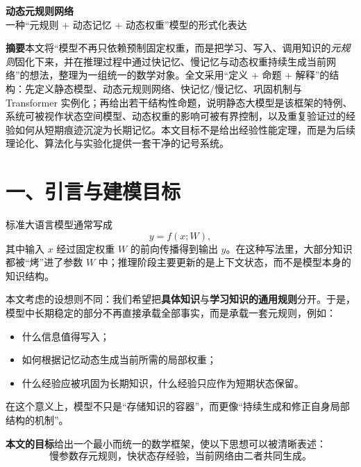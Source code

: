 \documentclass[11pt]{article}
\begin{document}
\begin{titlepage}
\centering
\vspace*{1.8cm}
{\Huge\bfseries 动态元规则网络\\[0.35em]}
{\Large \color{Accent}一种“元规则 + 动态记忆 + 动态权重”模型的形式化表达\\}
\vspace{1.2cm}
\begin{tcolorbox}[width=0.9\textwidth,colback=LightAccent,colframe=Accent,boxrule=0.7pt]
\small
\textbf{摘要}\quad 本文将“模型不再只依赖预制固定权重，而是把学习、写入、调用知识的\emph{元规则}固化下来，并在推理过程中通过快记忆、慢记忆与动态权重持续生成当前网络”的想法，整理为一组统一的数学对象。全文采用“定义 + 命题 + 解释”的结构：先定义静态模型、动态元规则网络、快记忆/慢记忆、巩固机制与 Transformer 实例化；再给出若干结构性命题，说明静态大模型是该框架的特例、系统可被视作状态空间模型、动态权重的影响可被有界控制，以及重复验证过的经验如何从短期痕迹沉淀为长期记忆。本文目标不是给出经验性能定理，而是为后续理论化、算法化与实验化提供一套干净的记号系统。
\end{tcolorbox}
\end{titlepage}

\section*{一、引言与建模目标}
标准大语言模型通常写成
\[
 y = f(x;W),
\]
其中输入 $x$ 经过固定权重 $W$ 的前向传播得到输出 $y$。在这种写法里，大部分知识都被“烤”进了参数 $W$ 中；推理阶段主要更新的是上下文状态，而不是模型本身的知识结构。

本文考虑的设想则不同：我们希望把\textbf{具体知识}与\textbf{学习知识的通用规则}分开。于是，模型中长期稳定的部分不再直接承载全部事实，而是承载一套元规则，例如：
\begin{itemize}
  \item 什么信息值得写入；
  \item 如何根据记忆动态生成当前所需的局部权重；
  \item 什么经验应被巩固为长期知识，什么经验只应作为短期状态保留。
\end{itemize}
在这个意义上，模型不只是“存储知识的容器”，而更像“持续生成和修正自身局部结构的机制”。

\begin{tcolorbox}[breakable,colback=LightAccent,colframe=Accent,boxrule=0.6pt]
\textbf{本文的目标}\quad 给出一个最小而统一的数学框架，使以下思想可以被清晰表述：
\[
\text{慢参数存元规则，快状态存经验，当前网络由二者共同生成。}
\]
\end{tcolorbox}
\end{document}

